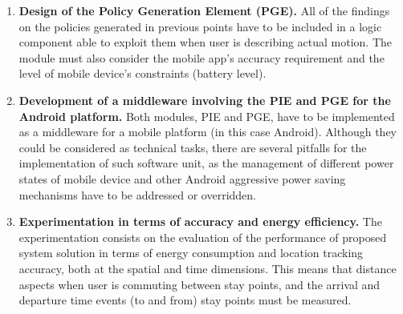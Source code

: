 \documentclass[ENG,PhD]{cinvestav}
\begin{document}
\begin{enumerate}
  \item \textbf{Design of the Policy Generation Element (PGE).}
  All of the findings on the policies generated in previous points have to be included in a logic component able to exploit them when user is describing actual motion.
  The module must also consider the mobile app's accuracy requirement and the level of mobile device's constraints (battery level).
  

  \item \textbf{Development of a middleware involving the PIE and PGE for the Android platform.}
  Both modules, PIE and PGE, have to be implemented as a middleware for a mobile platform (in this case Android).
  Although they could be considered as technical tasks, there are several pitfalls for the implementation of such software unit, as the management of different power states of mobile device and other Android aggressive power saving mechanisms have to be addressed or overridden.

  \item \textbf{Experimentation in terms of accuracy and energy efficiency.}
  The experimentation consists on the evaluation of the performance of proposed system solution in terms of energy consumption and location tracking accuracy, both at the spatial and time dimensions.
  This means that distance aspects when user is commuting between stay points, and the arrival and departure time events (to and from) stay points must be measured.
\end{enumerate}
\end{document}
